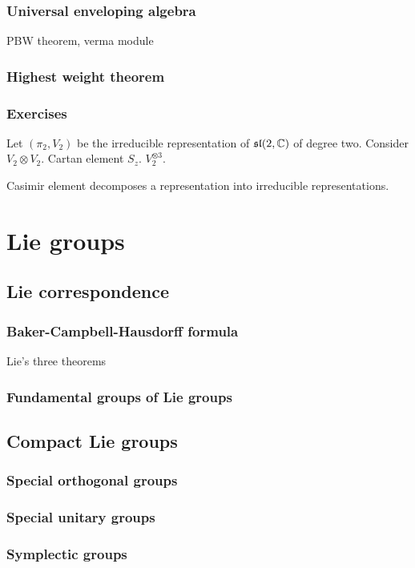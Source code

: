 \documentclass{../note}
\begin{document}
\section{Universal enveloping algebra}
PBW theorem, verma module
\section{Highest weight theorem}


\section*{Exercises}
\begin{prb}
Let $(\pi_2,V_2)$ be the irreducible representation of $\mathfrak{sl}(2,\mathbb{C})$ of degree two.
Consider $V_2\otimes V_2$.
Cartan element $S_z$.
$V_2^{\otimes3}$.
\end{prb}
\begin{prb}
Casimir element decomposes a representation into irreducible representations.
\end{prb}

\part{Lie groups}
\chapter{Lie correspondence}
\section{Baker-Campbell-Hausdorff formula}
Lie's three theorems
\section{Fundamental groups of Lie groups}

\chapter{Compact Lie groups}
\section{Special orthogonal groups}
\section{Special unitary groups}
\section{Symplectic groups}
\end{document}
